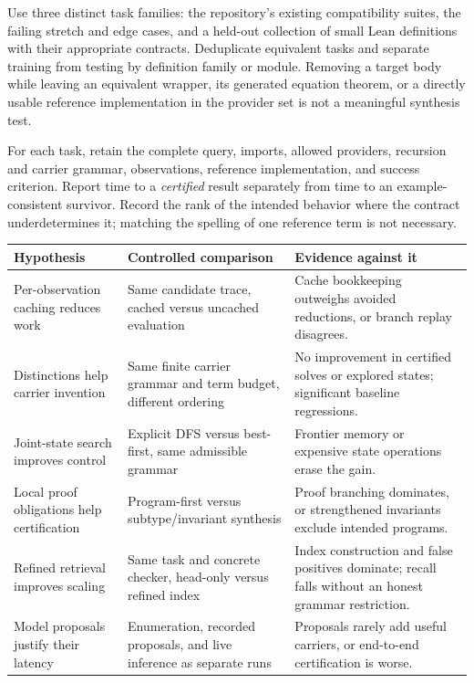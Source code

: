 Use three distinct task families: the repository's existing compatibility suites, the failing stretch and edge cases, and a held-out collection of small Lean definitions with their appropriate contracts. Deduplicate equivalent tasks and separate training from testing by definition family or module. Removing a target body while leaving an equivalent wrapper, its generated equation theorem, or a directly usable reference implementation in the provider set is not a meaningful synthesis test.

For each task, retain the complete query, imports, allowed providers, recursion and carrier grammar, observations, reference implementation, and success criterion. Report time to a \emph{certified} result separately from time to an example-consistent survivor. Record the rank of the intended behavior where the contract underdetermines it; matching the spelling of one reference term is not necessary.

\begin{longtable}{@{}p{.27\linewidth}p{.33\linewidth}p{.34\linewidth}@{}}
\toprule
Hypothesis & Controlled comparison & Evidence against it \\
\midrule
\endhead
Per-observation caching reduces work & Same candidate trace, cached versus uncached evaluation & Cache bookkeeping outweighs avoided reductions, or branch replay disagrees.\\
Distinctions help carrier invention & Same finite carrier grammar and term budget, different ordering & No improvement in certified solves or explored states; significant baseline regressions.\\
Joint-state search improves control & Explicit DFS versus best-first, same admissible grammar & Frontier memory or expensive state operations erase the gain.\\
Local proof obligations help certification & Program-first versus subtype/invariant synthesis & Proof branching dominates, or strengthened invariants exclude intended programs.\\
Refined retrieval improves scaling & Same task and concrete checker, head-only versus refined index & Index construction and false positives dominate; recall falls without an honest grammar restriction.\\
Model proposals justify their latency & Enumeration, recorded proposals, and live inference as separate runs & Proposals rarely add useful carriers, or end-to-end certification is worse.\\
\bottomrule
\end{longtable}

